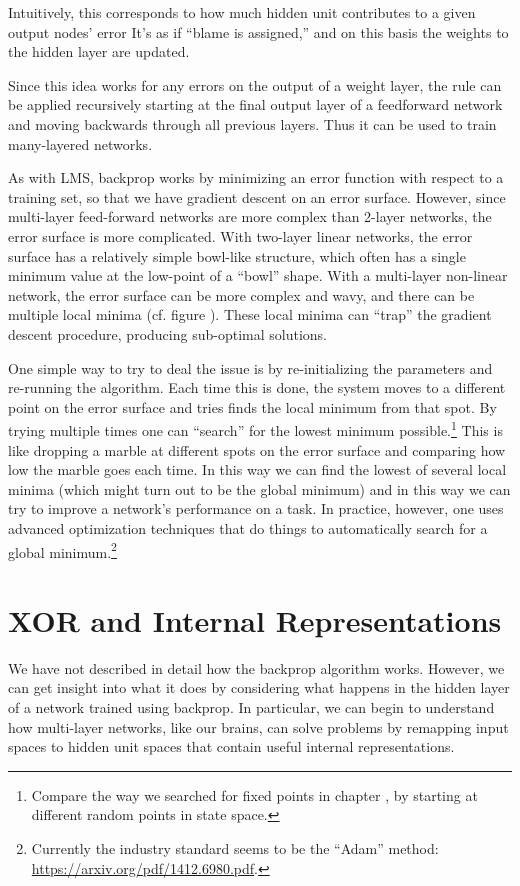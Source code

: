 Intuitively, this corresponds to how much hidden unit contributes to a given output nodes' error  It's as if ``blame is assigned,'' and on this basis the weights to the hidden layer are updated.

Since this idea works for any errors on the output of a weight layer, the rule can be applied recursively starting at the final output layer of a feedforward network and moving backwards through all previous layers. Thus it can be used to train many-layered networks. 

As with LMS, backprop works by minimizing an error function with respect to a training set, so that we have gradient descent on an error surface. However, since multi-layer feed-forward networks are more complex than 2-layer networks, the error surface is more complicated. With two-layer linear networks, the error surface has a relatively simple bowl-like structure, which often has a single minimum value at the low-point of a ``bowl'' shape. With a multi-layer non-linear network, the error surface can be more complex and wavy, and there can be multiple local minima (cf. figure ). These local minima can ``trap'' the gradient descent procedure, producing sub-optimal solutions.

One simple way to try to deal the issue is by re-initializing the parameters and re-running the algorithm. Each time this is done, the system moves to a different point on the error surface and tries finds the local minimum from that spot. By trying multiple times one can ``search'' for the lowest minimum possible.\footnote{Compare the way we searched for fixed points in chapter , by starting at different random points in state space.}  This is like dropping a marble at different spots on the error surface and comparing how low the marble goes each time. In this way we can find the lowest of several local minima (which might turn out to be the global minimum) and in this way we can try to improve a network's performance on a task. In practice, however, one uses advanced optimization techniques that do things to automatically search for a global minimum.\footnote{Currently the industry standard seems to be the ``Adam'' method: \url{https://arxiv.org/pdf/1412.6980.pdf}.}

\section{XOR and Internal Representations}

We have not described in detail how the backprop algorithm works. However, we can get insight into what it does by considering what happens in the hidden layer of a network trained using backprop. In particular, we can begin to understand how multi-layer networks, like our brains, can solve problems by remapping input spaces to hidden unit spaces that contain useful internal representations. 

